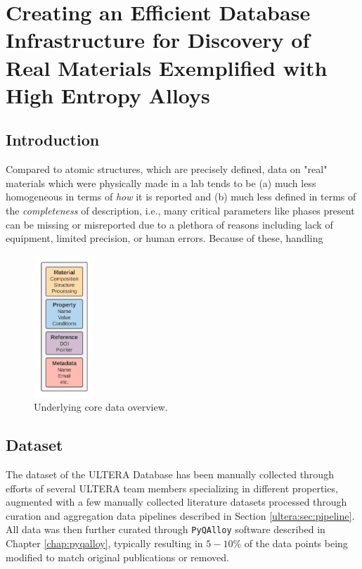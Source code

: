 \chapter{Creating an Efficient Database Infrastructure for Discovery of Real Materials Exemplified with High Entropy Alloys} \label{chap:ultera}

\section{Introduction} \label{ultera:sec:intro}

Compared to atomic structures, which are precisely defined, data on "real" materials which were physically made in a lab tends to be (a) much less homogeneous in terms of \textit{how} it is reported and (b) much less defined in terms of the \textit{completeness} of description, i.e., many critical parameters like phases present can be missing or misreported due to a plethora of reasons including lack of equipment, limited precision, or human errors. Because of these, handling 

\cite{Debnath2021GenerativeAlloys}
\cite{Debnath2023ComparingAlloys}
\cite{Li2024DesignExperiments}

\begin{figure}[H]
    \centering
    \includegraphics[width=0.2\textwidth]{ultera/ULTERA Data Detail_material.png}
    \caption{Underlying core data overview.}
    \label{ultera:fig:material}
\end{figure}


\section{Dataset} \label{ultera:sec:datadescription}
\newcommand{\statisticstime}{April 2024}

The dataset of the ULTERA Database has been manually collected through efforts of several ULTERA team members specializing in different properties, augmented with a few manually collected literature datasets processed through curation and aggregation data pipelines described in Section \ref{ultera:sec:pipeline}. All data was then further curated through \texttt{PyQAlloy} software described in Chapter \ref{chap:pyqalloy}, typically resulting in $5-10\%$ of the data points being modified to match original publications or removed.

